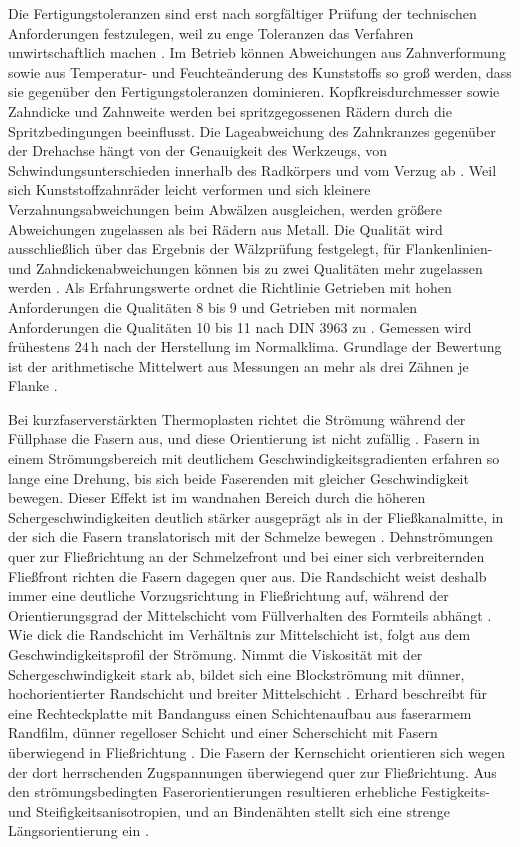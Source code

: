 Die Fertigungstoleranzen sind erst nach sorgfältiger Prüfung der technischen Anforderungen festzulegen, weil zu enge Toleranzen das Verfahren unwirtschaftlich machen \cite[S.~30]{VDI2736-1}. Im Betrieb können Abweichungen aus Zahnverformung sowie aus Temperatur- und Feuchteänderung des Kunststoffs so groß werden, dass sie gegenüber den Fertigungstoleranzen dominieren. Kopfkreisdurchmesser sowie Zahndicke und Zahnweite werden bei spritzgegossenen Rädern durch die Spritzbedingungen beeinflusst. Die Lageabweichung des Zahnkranzes gegenüber der Drehachse hängt von der Genauigkeit des Werkzeugs, von Schwindungsunterschieden innerhalb des Radkörpers und vom Verzug ab \cite[S.~30 f.]{VDI2736-1}. Weil sich Kunststoffzahnräder leicht verformen und sich kleinere Verzahnungsabweichungen beim Abwälzen ausgleichen, werden größere Abweichungen zugelassen als bei Rädern aus Metall. Die Qualität wird ausschließlich über das Ergebnis der Wälzprüfung festgelegt, für Flankenlinien- und Zahndickenabweichungen können bis zu zwei Qualitäten mehr zugelassen werden \cite[S.~33 f.]{VDI2736-1}. Als Erfahrungswerte ordnet die Richtlinie Getrieben mit hohen Anforderungen die Qualitäten 8 bis 9 und Getrieben mit normalen Anforderungen die Qualitäten 10 bis 11 nach DIN 3963 zu \cite[S.~34]{VDI2736-1}. Gemessen wird frühestens $24$\,h nach der Herstellung im Normalklima. Grundlage der Bewertung ist der arithmetische Mittelwert aus Messungen an mehr als drei Zähnen je Flanke \cite[S.~33]{VDI2736-1}.

Bei kurzfaserverstärkten Thermoplasten richtet die Strömung während der Füllphase die Fasern aus, und diese Orientierung ist nicht zufällig \cite[S.~280]{Sto18}. Fasern in einem Strömungsbereich mit deutlichem Geschwindigkeitsgradienten erfahren so lange eine Drehung, bis sich beide Faserenden mit gleicher Geschwindigkeit bewegen. Dieser Effekt ist im wandnahen Bereich durch die höheren Schergeschwindigkeiten deutlich stärker ausgeprägt als in der Fließkanalmitte, in der sich die Fasern translatorisch mit der Schmelze bewegen \cite[S.~281]{Sto18}. Dehnströmungen quer zur Fließrichtung an der Schmelzefront und bei einer sich verbreiternden Fließfront richten die Fasern dagegen quer aus. Die Randschicht weist deshalb immer eine deutliche Vorzugsrichtung in Fließrichtung auf, während der Orientierungsgrad der Mittelschicht vom Füllverhalten des Formteils abhängt \cite[S.~281]{Sto18}. Wie dick die Randschicht im Verhältnis zur Mittelschicht ist, folgt aus dem Geschwindigkeitsprofil der Strömung. Nimmt die Viskosität mit der Schergeschwindigkeit stark ab, bildet sich eine Blockströmung mit dünner, hochorientierter Randschicht und breiter Mittelschicht \cite[S.~281]{Sto18}. Erhard beschreibt für eine Rechteckplatte mit Bandanguss einen Schichtenaufbau aus faserarmem Randfilm, dünner regelloser Schicht und einer Scherschicht mit Fasern überwiegend in Fließrichtung \cite[S.~255 f.]{Erh08}. Die Fasern der Kernschicht orientieren sich wegen der dort herrschenden Zugspannungen überwiegend quer zur Fließrichtung. Aus den strömungsbedingten Faserorientierungen resultieren erhebliche Festigkeits- und Steifigkeitsanisotropien, und an Bindenähten stellt sich eine strenge Längsorientierung ein \cite[S.~257 und 259]{Erh08}.


